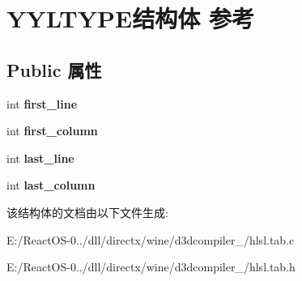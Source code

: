 \hypertarget{struct_y_y_l_t_y_p_e}{}\section{Y\+Y\+L\+T\+Y\+P\+E结构体 参考}
\label{struct_y_y_l_t_y_p_e}
\subsection*{Public 属性}
\begin{DoxyCompactItemize}
\item 
\mbox{\label{struct_y_y_l_t_y_p_e_a50ad3435eaea74bcab6f1ae5fbaefd89}} 
int {\bfseries first\+\_\+line}
\item 
\mbox{\label{struct_y_y_l_t_y_p_e_a3a556533babab1b9066fa9bdbb809210}} 
int {\bfseries first\+\_\+column}
\item 
\mbox{\label{struct_y_y_l_t_y_p_e_a3075f2bc3448df5d2a9f16d22bff2cc1}} 
int {\bfseries last\+\_\+line}
\item 
\mbox{\label{struct_y_y_l_t_y_p_e_acf87f8c98686f286eaf700c4b62157b2}} 
int {\bfseries last\+\_\+column}
\end{DoxyCompactItemize}


该结构体的文档由以下文件生成\+:\begin{DoxyCompactItemize}
\item 
E\+:/\+React\+O\+S-\/0../dll/directx/wine/d3dcompiler\+\_/hlsl.\+tab.\+c\item 
E\+:/\+React\+O\+S-\/0../dll/directx/wine/d3dcompiler\+\_/hlsl.\+tab.\+h\end{DoxyCompactItemize}
